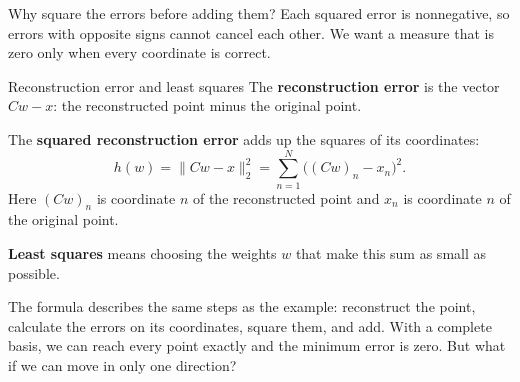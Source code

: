 \documentclass[a4paper,12pt,oneside]{report}
\begin{document}
Why square the errors before adding them? Each squared error is
nonnegative, so errors with opposite signs cannot cancel each other.
We want a measure that is zero only when every coordinate is correct.

\begin{frameddefn}{Reconstruction error and least squares}
The \textbf{reconstruction error} is the vector $Cw-x$: the
reconstructed point minus the original point.

The \textbf{squared reconstruction error} adds up the squares of
its coordinates:
\[
  h(w)=\lVert Cw-x\rVert_2^2
      =\sum_{n=1}^{N}\bigl((Cw)_n-x_n\bigr)^2.
\]
Here $(Cw)_n$ is coordinate $n$ of the reconstructed point and $x_n$
is coordinate $n$ of the original point.

\textbf{Least squares} means choosing the weights $w$ that make
this sum as small as possible.
\end{frameddefn}

The formula describes the same steps as the example: reconstruct the
point, calculate the errors on its coordinates, square them, and add.
With a complete basis, we can reach every point exactly and the
minimum error is zero. But what if we can move in only one direction?
\end{document}
